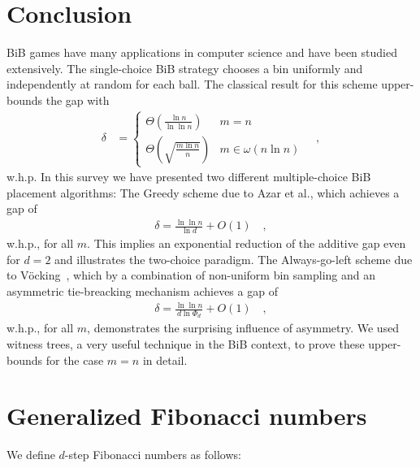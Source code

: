 \documentclass[a4paper,12pt]{article}
\begin{document}
\section{Conclusion}
\label{sec:conclusion}
BiB games have many applications in computer science and have been studied extensively. The single-choice BiB strategy chooses a bin uniformly and independently at random for each ball. The classical result for this scheme upper-bounds the gap with~\cite{RS98}
\begin{align*}
\delta &= 
    \begin{cases}
    \Theta\left(\frac{\ln n}{\ln\ln n}\right)           & m = n \\
    \Theta\left(\sqrt{\frac{m\ln n}{n}} \right)              & m \in \omega(n \ln n)
    \end{cases} \quad ,    
\end{align*}
w.h.p.
In this survey we have presented two different multiple-choice BiB placement algorithms: The Greedy scheme due to Azar et al.\cite{ABKU99}, which achieves a gap of 
\begin{align*}
\delta = \frac{\ln\ln n}{\ln d} + O(1) \quad ,
\end{align*}
w.h.p., for all $m$. This implies an exponential reduction of the additive gap even for $d=2$ and illustrates the two-choice paradigm.
The Always-go-left scheme due to V\"ocking~\cite{VOC03}, which by a combination of non-uniform bin sampling and an asymmetric tie-breacking mechanism achieves a gap of
\begin{align*}
\delta = \frac{\ln \ln n}{d \ln \Phi_d} + O(1) \quad ,
\end{align*}
w.h.p., for all $m$, demonstrates the surprising influence of asymmetry. We used witness trees, a very useful technique in the BiB context, to prove these upper-bounds for the case $m=n$ in detail.

\appendix
\section{Generalized Fibonacci numbers}
\label{sec:fibonacci}
We define $d$-step Fibonacci numbers as follows:
\end{document}
